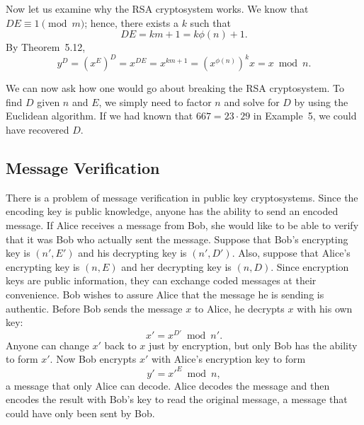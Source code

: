  
Now let us examine why the RSA cryptosystem works.  We know that $DE
\equiv 1 \pmod{ m}$; hence, there exists a $k$ such that 
\[
DE = km + 1 = k \phi(n) + 1.
\]
By Theorem~5.12,
\[
y^D = (x^E)^D = x^{DE} = x^{km+1} = (x^{\phi(n)})^k x = x \bmod n.
\]
 
 
We can now ask how one would go about breaking the RSA cryptosystem.
To find $D$ given $n$ and $E$, we simply need to factor $n$ and solve
for $D$ by using the Euclidean algorithm. If we had known that $667 =
23 \cdot 29$ in Example~5, we could have recovered $D$.    
 
 
 
\subsection*{Message Verification}
 
 
There is a problem of message verification in public key
cryptosystems. Since the encoding key is public knowledge, anyone has
the ability to send an encoded message.  If Alice receives a message
from Bob, she would like to be able to verify that it was Bob who
actually sent the message. Suppose that Bob's encrypting key is $(n',
E')$ and his decrypting key is $(n', D')$.  Also, suppose that Alice's
encrypting key is $(n, E)$ and her decrypting key is $(n, D)$.  Since
encryption keys are public information, they can exchange coded
messages at their convenience.  Bob wishes to assure Alice that the
message he is sending is authentic. Before Bob sends the message $x$
to Alice, he decrypts  $x$ with his own key:
\[
x' = x ^{D'} \bmod n'.
\]
Anyone can change $x'$ back to $x$ just by encryption, but only Bob
has the ability to form $x'$. Now Bob encrypts $x'$ with Alice's
encryption key to form 
\[
y' = {x'}^E  \bmod n,
\]
a message that only Alice can decode.  Alice decodes the message and
then encodes the result with Bob's key to read the original message, a
message that could have only been sent by Bob.
 
 
 
\histhead
 
